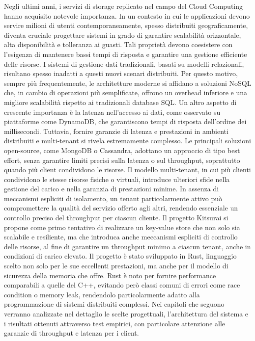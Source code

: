 Negli ultimi anni, i servizi di storage replicato nel campo del Cloud Computing hanno acquisito notevole importanza. 
In un contesto in cui le applicazioni devono servire milioni di utenti contemporaneamente, spesso distribuiti geograficamente, diventa cruciale progettare sistemi in grado di garantire scalabilità orizzontale, alta disponibilità e tolleranza ai guasti.
Tali proprietà devono coesistere con l'esigenza di mantenere bassi tempi di risposta e garantire una gestione efficiente delle risorse.
I sistemi di gestione dati tradizionali, basati su modelli relazionali, risultano spesso inadatti a questi nuovi scenari distribuiti.
Per questo motivo, sempre più frequentemente, le architetture moderne si affidano a soluzioni NoSQL che, in cambio di operazioni più semplificate, offrono un overhead inferiore e una migliore scalabilità rispetto ai tradizionali database SQL.
Un altro aspetto di crescente importanza è la latenza nell'accesso ai dati, come osservato su piattaforme come DynamoDB, che garantiscono tempi di risposta dell'ordine dei millisecondi.
Tuttavia, fornire garanzie di latenza e prestazioni in ambienti distribuiti e multi-tenant si rivela estremamente complesso.
Le principali soluzioni open-source, come MongoDB o Cassandra, adottano un approccio di tipo best effort, senza garantire limiti precisi sulla latenza o sul throughput, soprattutto quando più client condividono le risorse.
Il modello multi-tenant, in cui più clienti condividono le stesse risorse fisiche o virtuali, introduce ulteriori sfide nella gestione del carico e nella garanzia di prestazioni minime.
In assenza di meccanismi espliciti di isolamento, un tenant particolarmente attivo può compromettere la qualità del servizio offerto agli altri, rendendo essenziale un controllo preciso del throughput per ciascun cliente.
Il progetto Kitsurai si propone come primo tentativo di realizzare un key-value store che non solo sia scalabile e resiliente, ma che introduca anche meccanismi espliciti di controllo delle risorse, al fine di garantire un throughput minimo a ciascun tenant, anche in condizioni di carico elevato.
Il progetto è stato sviluppato in Rust, linguaggio scelto non solo per le sue eccellenti prestazioni, ma anche per il modello di sicurezza della memoria che offre.
Rust è noto per fornire performance comparabili a quelle del C++, evitando però classi comuni di errori come race condition o memory leak, rendendolo particolarmente adatto alla programmazione di sistemi distribuiti complessi.
Nei capitoli che seguono verranno analizzate nel dettaglio le scelte progettuali, l'architettura del sistema e i risultati ottenuti attraverso test empirici, con particolare attenzione alle garanzie di throughput e latenza per i client.
